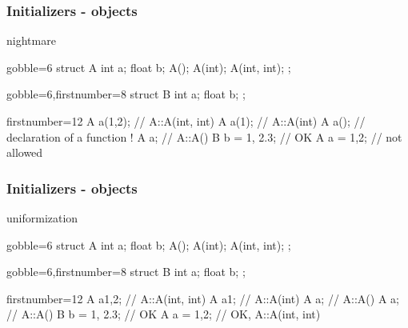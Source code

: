 \begin{frame}[fragile]
  \frametitle{Initializers - objects}
  \begin{block}{ nightmare}
    \begin{multicols}{2}
      \begin{cppcode*}{gobble=6}
        struct A {
          int a;
          float b;
          A();
          A(int);
          A(int, int);
        };
      \end{cppcode*}
      \columnbreak
      \begin{cppcode*}{gobble=6,firstnumber=8}
        struct B {
          int a;
          float b;
        };
      \end{cppcode*}
    \end{multicols}
    \pause
    \begin{cppcode*}{firstnumber=12}
     A a(1,2);       // A::A(int, int)
     A a(1);         // A::A(int)
     A a();          // declaration of a function !
     A a;            // A::A()
     B b = {1, 2.3}; // OK
     A a = {1,2};    // not allowed
    \end{cppcode*}
  \end{block}
\end{frame}

\begin{frame}[fragile]
  \frametitle{Initializers - objects}
  \begin{block}{ uniformization}
    \begin{multicols}{2}
      \begin{cppcode*}{gobble=6}
        struct A {
          int a;
          float b;
          A();
          A(int);
          A(int, int);
        };
      \end{cppcode*}
      \columnbreak
      \begin{cppcode*}{gobble=6,firstnumber=8}
        struct B {
          int a;
          float b;
        };
      \end{cppcode*}
    \end{multicols}
    \begin{cppcode*}{firstnumber=12}
     A a{1,2};       // A::A(int, int)
     A a{1};         // A::A(int)
     A a{};          // A::A()
     A a;            // A::A()
     B b = {1, 2.3}; // OK
     A a = {1,2};    // OK, A::A(int, int)
    \end{cppcode*}
  \end{block}
\end{frame}

